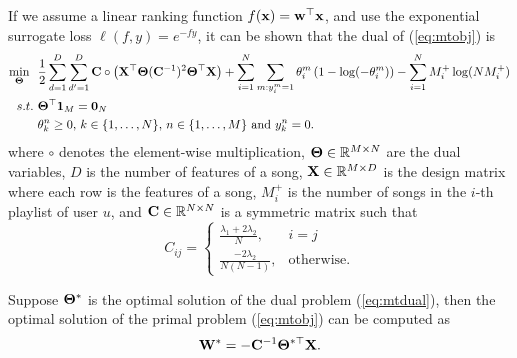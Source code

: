 If we assume a linear ranking function $f(\mathbf{x}) = \mathbf{w}^\top \mathbf{x}$, 
and use the exponential surrogate loss $\ell(f, y) = e^{-fy}$,
it can be shown that the dual of (\ref{eq:mtobj}) is
\begin{equation}
\label{eq:mtdual}
\begin{aligned}
\min_{\mathbf{\Theta}} \ \ & \frac{1}{2} \sum_{d=1}^{D} \sum_{d'=1}^{D} \mathbf{C} \circ \left( \mathbf{X}^\top \mathbf{\Theta} (\mathbf{C}^{-1})^2 \mathbf{\Theta}^\top \mathbf{X} \right) 
    + \sum_{i = 1}^{N} \sum_{m: y_i^m = 1} \theta_i^m \left( 1 - \log(-\theta_i^m) \right) - \sum_{i=1}^{N} M_i^+ \log(N M_i^+) \\
s.t. \ & \mathbf{\Theta}^\top \mathbf{1}_M = \mathbf{0}_{N} \\
       & \theta_k^n \ge 0, \, k \in \{1,\dots,N\}, \, n \in \{1,\dots,M\} \ \mathrm{and} \ y_k^n = 0.
\end{aligned}
\end{equation}
where $\circ$ denotes the element-wise multiplication,
$\mathbf{\Theta} \in \mathbb{R}^{M \times N}$ are the dual variables, $D$ is the number of features of a song, 
$\mathbf{X} \in \mathbb{R}^{M \times D}$ is the design matrix where each row is the features of a song,
$M_i^+$ is the number of songs in the $i$-th playlist of user $u$,
and $\mathbf{C} \in \mathbb{R}^{N \times N}$ is a symmetric matrix such that
\begin{equation*}
C_{ij} = \begin{cases}
\frac{\lambda_1 + 2\lambda_2}{N}, & i = j \\
\frac{-2\lambda_2}{N (N - 1)},  & \mathrm{otherwise}.
\end{cases}
\end{equation*}

Suppose $\mathbf{\Theta}^*$ is the optimal solution of the dual problem (\ref{eq:mtdual}), 
then the optimal solution of the primal problem (\ref{eq:mtobj}) can be computed as
\begin{equation*}
\mathbf{W}^* = -\mathbf{C}^{-1} \mathbf{\Theta}^{*\top} \mathbf{X}.
\end{equation*}



